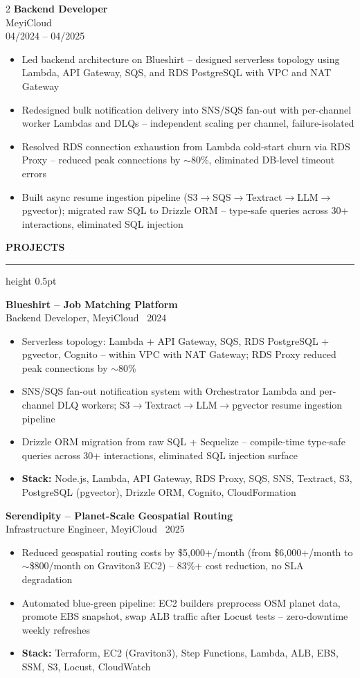 \documentclass[8.8pt,a4paper]{article}
\newcommand{\ressection}[1]{%
  \vspace{2pt}%
  {\fontsize{7.8}{9}\selectfont\bfseries\color{darkgray}\MakeUppercase{#1}}%
  \vspace{1pt}\hrule height 0.5pt\vspace{2pt}%
}
\newcommand{\jobentry}[3]{%
  {\fontsize{8.5}{10}\selectfont\bfseries\color{darkgray}#1}\\[0.2pt]%
  {\fontsize{7.8}{9}\selectfont\color{teal}#2}\\[0.2pt]%
  {\fontsize{6.8}{8}\selectfont\color{medgray}#3}%
  \vspace{0.8pt}%
}
\newcommand{\projentry}[3]{%
  {\fontsize{8.2}{9.5}\selectfont\bfseries\color{darkgray}#1}\\[0.2pt]%
  {\fontsize{7}{8.5}\selectfont\color{medgray}#2 \textbullet\ #3}%
  \vspace{0.8pt}%
}
\newcommand{\bi}[1]{{\fontsize{7.2}{9.5}\selectfont #1}}
\begin{document}
\begin{paracol}{2}
\vspace{1.5pt}
\jobentry{Backend Developer}{MeyiCloud}{04/2024 -- 04/2025}
\begin{itemize}
\item\bi{Led backend architecture on Blueshirt -- designed serverless topology using Lambda, API Gateway, SQS, and RDS PostgreSQL with VPC and NAT Gateway}
\item\bi{Redesigned bulk notification delivery into SNS/SQS fan-out with per-channel worker Lambdas and DLQs -- independent scaling per channel, failure-isolated}
\item\bi{Resolved RDS connection exhaustion from Lambda cold-start churn via RDS Proxy -- reduced peak connections by $\sim$80\%, eliminated DB-level timeout errors}
\item\bi{Built async resume ingestion pipeline (S3$\to$SQS$\to$Textract$\to$LLM$\to$pgvector); migrated raw SQL to Drizzle ORM -- type-safe queries across 30+ interactions, eliminated SQL injection}
\end{itemize}

\vspace{1pt}
\ressection{Projects}

\projentry{Blueshirt -- Job Matching Platform}{Backend Developer, MeyiCloud}{2024}
\begin{itemize}
\item\bi{Serverless topology: Lambda + API Gateway, SQS, RDS PostgreSQL + pgvector, Cognito -- within VPC with NAT Gateway; RDS Proxy reduced peak connections by $\sim$80\%}
\item\bi{SNS/SQS fan-out notification system with Orchestrator Lambda and per-channel DLQ workers; S3$\to$Textract$\to$LLM$\to$pgvector resume ingestion pipeline}
\item\bi{Drizzle ORM migration from raw SQL + Sequelize -- compile-time type-safe queries across 30+ interactions, eliminated SQL injection surface}
\item\bi{\textbf{Stack:} Node.js, Lambda, API Gateway, RDS Proxy, SQS, SNS, Textract, S3, PostgreSQL (pgvector), Drizzle ORM, Cognito, CloudFormation}
\end{itemize}

\vspace{1.5pt}
\projentry{Serendipity -- Planet-Scale Geospatial Routing}{Infrastructure Engineer, MeyiCloud}{2025}
\begin{itemize}
\item\bi{Reduced geospatial routing costs by \$5,000+/month (from \$6,000+/month to $\sim$\$800/month on Graviton3 EC2) -- 83\%+ cost reduction, no SLA degradation}
\item\bi{Automated blue-green pipeline: EC2 builders preprocess OSM planet data, promote EBS snapshot, swap ALB traffic after Locust tests -- zero-downtime weekly refreshes}
\item\bi{\textbf{Stack:} Terraform, EC2 (Graviton3), Step Functions, Lambda, ALB, EBS, SSM, S3, Locust, CloudWatch}
\end{itemize}


\end{paracol}
\end{document}
